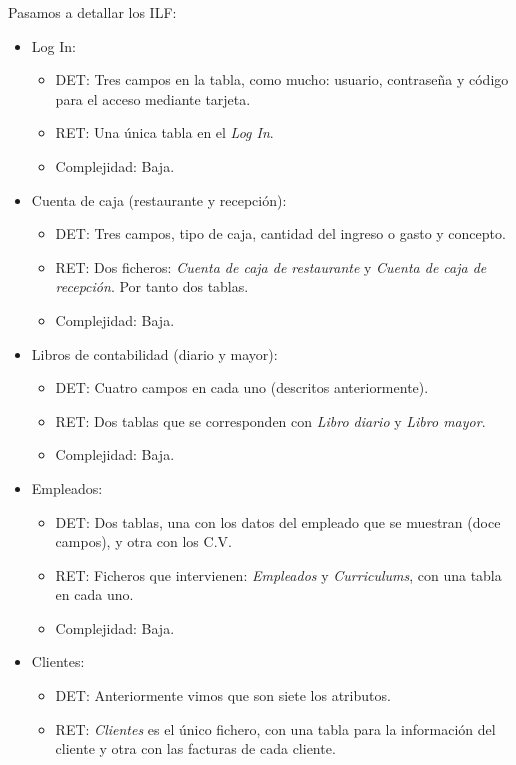 \documentclass[spanish,a4paper,11pt, twoside]{report}	%
\begin{document}
	Pasamos a detallar los ILF:
	\begin{itemize}
		\item{Log In:} 
		\begin{itemize}
 			\item{DET:} Tres campos en la tabla, como mucho: usuario, contraseña y código para el acceso mediante tarjeta.
			\item{RET:} Una única tabla en el \textit{Log In}.
			\item{Complejidad:} Baja.
		\end{itemize}
		\item{Cuenta de caja (restaurante y recepción):} 
		\begin{itemize}
 			\item{DET:} Tres campos, tipo de caja, cantidad del ingreso o gasto y concepto.
			\item{RET:} Dos ficheros: \textit{Cuenta de caja de restaurante} y \textit{Cuenta de caja de recepción}. Por tanto dos tablas.
			\item{Complejidad:} Baja.
		\end{itemize}
		\item{Libros de contabilidad (diario y mayor):} 
		\begin{itemize}
 			\item{DET:} Cuatro campos en cada uno (descritos anteriormente).
			\item{RET:} Dos tablas que se corresponden con \textit{Libro diario} y \textit{Libro mayor}.
			\item{Complejidad:} Baja.
		\end{itemize}
		\item{Empleados:} 
		\begin{itemize}
 			\item{DET:} Dos tablas, una con los datos del empleado que se muestran (doce campos), y otra con los C.V.
			\item{RET:} Ficheros que intervienen: \textit{Empleados} y \textit{Curriculums}, con una tabla en cada uno.
			\item{Complejidad:} Baja.
		\end{itemize}
		\item{Clientes:} 
		\begin{itemize}
 			\item{DET:} Anteriormente vimos que son siete los atributos.
			\item{RET:} \textit{Clientes} es el único fichero, con una tabla para la información del cliente y otra con las facturas de cada cliente.

\end{itemize}
\end{itemize}
\end{document}
